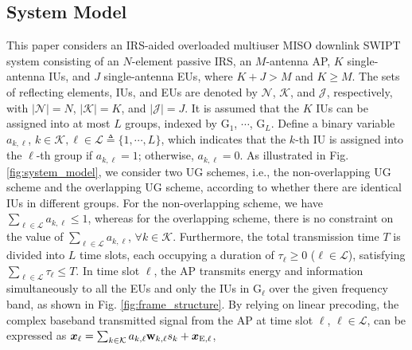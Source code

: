 \documentclass[12pt,draftclsnofoot, onecolumn]{IEEEtran}
\newcommand{\bm}[1]{\mbox{\boldmath{$#1$}}}
\theoremstyle{plain}
\begin{document}
\begin{sloppypar}
\subsection{System Model}

This paper considers an IRS-aided overloaded multiuser MISO downlink SWIPT system consisting of an $N$-element passive IRS, %
an $M$-antenna AP, $K$ single-antenna IUs, and $J$ single-antenna EUs, where $K + J > M$ and $K \geq M$. The sets of reflecting elements, IUs, and EUs are denoted by $\mathcal N$, $\mathcal K$, and $\mathcal J$, respectively, with $\left|\mathcal N\right| = N$, $\left|\mathcal K\right| = K$, and $\left|\mathcal J\right| = J$. It is assumed that the $K$ IUs can be assigned into at most $L$ groups, indexed by G$_1$, $\cdots$, G$_L$. Define a binary variable $a_{k,\ell}$, $k\in\mathcal K, \ell \in \mathcal L \triangleq \{1,\cdots,L\}$, which indicates that the $k$-th IU is assigned into the $\ell$-th group if $a_{k,\ell} = 1$; otherwise, $a_{k,\ell} = 0$. As illustrated in Fig. \ref{fig:system_model}, we consider two UG schemes, i.e., the non-overlapping UG scheme and the overlapping UG scheme, according to whether there are identical IUs in different groups. For the non-overlapping scheme, we have $\sum_{\ell \in\mathcal L} a_{k,\ell} \leq 1$, whereas for the overlapping scheme, there is no constraint on the value of $\sum_{\ell \in\mathcal L} a_{k,\ell}$, $ \forall k\in\mathcal K$. Furthermore, the total transmission time $T$ is divided into $L$ time slots, each occupying a duration of $\tau_\ell \geq 0$ ($\ell\in\mathcal L$), satisfying $\sum_{\ell \in\mathcal L}\tau_\ell \leq T$. In time slot $\ell$, the AP transmits energy and information simultaneously to all the EUs and only the IUs in G$_\ell$ over the given frequency band, as shown in Fig. \ref{fig:frame_structure}. By relying on linear precoding, the complex baseband transmitted signal from the AP at time slot $\ell$, $\ell\in\mathcal L$, can be expressed as $\bm x_\ell = \sum_{k\in\mathcal K}a_{k,\ell}\mathbf w_{k,\ell}s_{k} + \bm x_{\mathrm E,\ell}$, 

\end{sloppypar}
\end{document}
